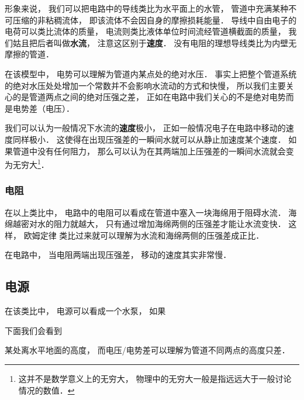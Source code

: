 

形象来说， 我们可以把电路中的导线类比为水平面上的水管， 管道中充满某种不可压缩的非粘稠流体， 即该流体不会因自身的摩擦损耗能量． 导线中自由电子的电荷可以类比流体的质量， 电流则类比液体单位时间流经管道横截面的质量， 我们姑且把后者叫做\textbf{水流}， 注意这区别于\textbf{速度}． 没有电阻的理想导线类比为内壁无摩擦的管道．

在该模型中， 电势可以理解为管道内某点处的绝对水压． 事实上把整个管道系统的绝对水压处处增加一个常数并不会影响水流动的方式和快慢， 所以我们主要关心的是管道两点之间的绝对压强之差， 正如在电路中我们关心的不是绝对电势而是电势差（电压）．

我们可以认为一般情况下水流的\textbf{速度}极小， 正如一般情况电子在电路中移动的速度同样极小． 这使得在出现压强差的一瞬间水就可以从静止加速度某个速度． 如果管道中没有任何阻力， 那么可以认为在其两端加上压强差的一瞬间水流就会变为无穷大\footnote{这并不是数学意义上的无穷大， 物理中的无穷大一般是指远远大于一般讨论情况的数值．}．

\subsubsection{电阻}
在以上类比中， 电路中的电阻可以看成在管道中塞入一块海绵用于阻碍水流． 海绵越密对水的阻力就越大， 只有通过增加海绵两侧的压强差才能让水流变快． 这样， 欧姆定律 类比过来就可以理解为水流和海绵两侧的压强差成正比．

在电路中， 当电阻两端出现压强差， 移动的速度其实非常慢． 

\subsection{电源}
在该类比中， 电源可以看成一个水泵， 如果




下面我们会看到

某处离水平地面的高度， 而电压/电势差可以理解为管道不同两点的高度只差．

